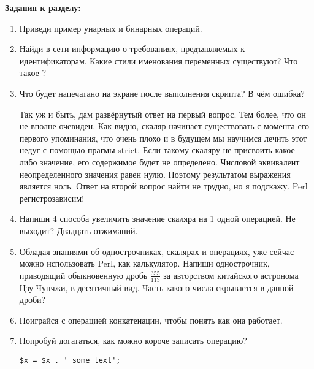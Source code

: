 {\large{\textbf{Задания к разделу:}}}

\begin{enumerate}
\item Приведи пример унарных и бинарных операций.
\item Найди в сети информацию о требованиях, предъявляемых к
идентификаторам. Какие стили именования переменных существуют? Что такое
 ?
\item Что будет напечатано на экране после выполнения скрипта? В чём
ошибка?


Так уж и быть, дам развёрнутый ответ на первый вопрос. Тем более, что он не 
вполне очевиден. Как видно, скаляр начинает существовать с момента его 
первого упоминания, что очень плохо и в будущем мы научимся лечить этот 
недуг с помощью прагмы strict. Если такому скаляру не присвоить какое-либо 
значение, его содержимое будет не определено. Числовой эквивалент 
неопределенного значения равен нулю. Поэтому результатом выражения 
является ноль. Ответ на второй вопрос найти не трудно, но я подскажу. Perl 
регистрозависим!
\item Напиши 4 способа увеличить значение скаляра на 1 одной
операцией. Не выходит? Двадцать отжиманий.
\item Обладая знаниями об однострочниках, скалярах и операциях, уже
сейчас можно использовать Perl, как калькулятор. Напиши однострочник,
приводящий обыкновенную дробь $\frac{355}{113}$ за авторством китайского
астронома Цзу Чунчжи, в десятичный вид. Часть какого числа скрывается в
данной дроби?

\item Поиграйся с операцией конкатенации, чтобы понять как она работает.
\item Попробуй догататься, как можно короче записать операцию?
\begin{verbatim}
$x = $x . ' some text';
\end{verbatim}
\end{enumerate}


